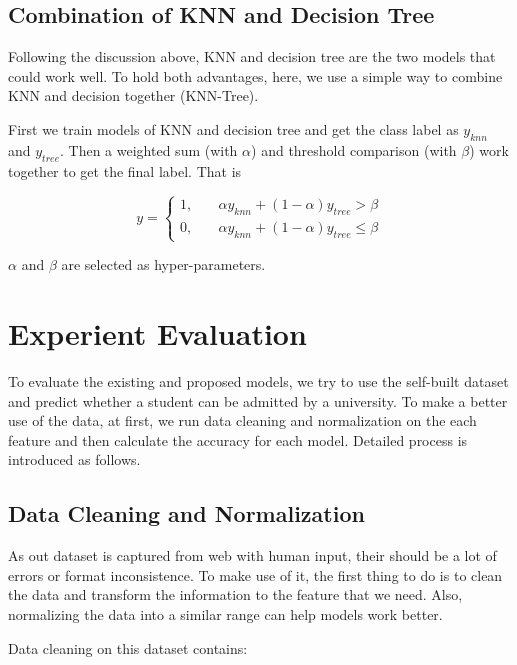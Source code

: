 \documentclass{article}
\begin{document}
\subsection{Combination of KNN and Decision Tree}

Following the discussion above, KNN and decision tree are the two models that could work well. To hold both advantages, here, we use a simple way to combine KNN and decision together (KNN-Tree).

First we train models of KNN and decision tree and get the class label as $y_{knn}$ and $y_{tree}$. Then a weighted sum (with $\alpha$) and threshold comparison (with $\beta$) work together to get the final label. That is

\begin{equation*}
    y=\left\{
    \begin{aligned}
        1,\quad & \alpha y_{knn}+(1-\alpha)y_{tree}>\beta\\
        0,\quad & \alpha y_{knn}+(1-\alpha)y_{tree}\le\beta
    \end{aligned}\right.
\end{equation*}

$\alpha$ and $\beta$ are selected as hyper-parameters.


\section{Experient Evaluation}

To evaluate the existing and proposed models, we try to use the self-built dataset and predict whether a student can be admitted by a university. To make a better use of the data, at first, we run data cleaning and normalization on the each feature and then calculate the accuracy for each model. Detailed process is introduced as follows.

\subsection{Data Cleaning and Normalization}

As out dataset is captured from web with human input, their should be a lot of errors or format inconsistence. To make use of it, the first thing to do is to clean the data and transform the information to the feature that we need. Also, normalizing the data into a similar range can help models work better.

Data cleaning on this dataset contains:
\end{document}
